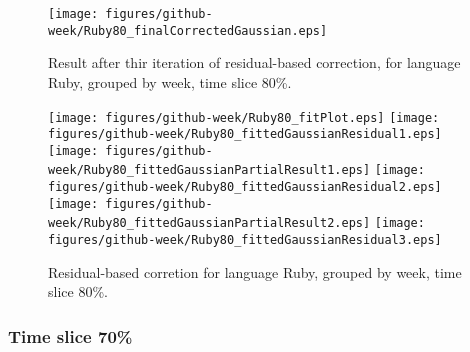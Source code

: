 \begin{figure}[]
\centering
{\texttt{[image: figures/github-week/Ruby80\_finalCorrectedGaussian.eps]}}
\caption{Result after thir iteration of residual-based correction, for language Ruby, grouped by week, time slice 80\%.}
\end{figure}


\begin{figure}[hb]
\centering
{}
{\texttt{[image: figures/github-week/Ruby80\_fitPlot.eps]}}
{\texttt{[image: figures/github-week/Ruby80\_fittedGaussianResidual1.eps]}}
{\texttt{[image: figures/github-week/Ruby80\_fittedGaussianPartialResult1.eps]}}
{\texttt{[image: figures/github-week/Ruby80\_fittedGaussianResidual2.eps]}}
{\texttt{[image: figures/github-week/Ruby80\_fittedGaussianPartialResult2.eps]}}
{\texttt{[image: figures/github-week/Ruby80\_fittedGaussianResidual3.eps]}}
\caption{Residual-based corretion for language Ruby, grouped by week, time slice 80\%.}
\end{figure}


\clearpage 
\newpage 


\FloatBarrier

\subsubsection{Time slice 70\%}

